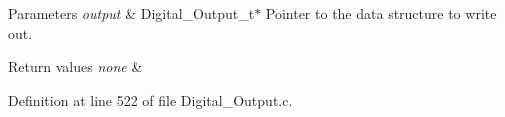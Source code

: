 \begin{DoxyParams}{Parameters}
{\em output} & Digital\-\_\-\-Output\-\_\-t$\ast$ Pointer to the data structure to write out. \\
\hline
\end{DoxyParams}

\begin{DoxyRetVals}{Return values}
{\em none} & \\
\hline
\end{DoxyRetVals}


Definition at line 522 of file Digital\-\_\-\-Output.\-c.

